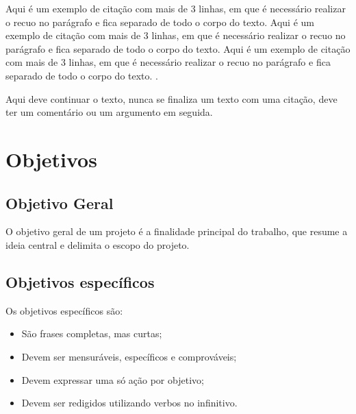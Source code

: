 \begin{citedireto}
[\ldots]Aqui é um exemplo de citação com mais de 3 linhas, em que é necessário realizar o recuo no parágrafo e fica separado de todo o corpo do texto. Aqui é um exemplo de citação com mais de 3 linhas, em que é necessário realizar o recuo no parágrafo e fica separado de todo o corpo do texto. Aqui é um exemplo de citação com mais de 3 linhas, em que é necessário realizar o recuo no parágrafo e fica separado de todo o corpo do texto. \cite[p.~324]{citacao3}.
\end{citedireto}


Aqui deve continuar o texto, nunca se finaliza um texto com uma citação, deve ter um comentário ou um argumento em seguida.

\section{Objetivos}


\subsection{Objetivo Geral}

O objetivo geral de um projeto é a finalidade principal do trabalho, que resume a ideia central e delimita o escopo do projeto. 

\subsection{Objetivos específicos}
Os objetivos específicos são:
\begin{itemize}
	\item São frases completas, mas curtas;
        \item Devem ser mensuráveis, específicos e comprováveis;
	\item Devem expressar uma só ação por objetivo;
	\item Devem ser redigidos utilizando verbos no infinitivo.
\end{itemize}

